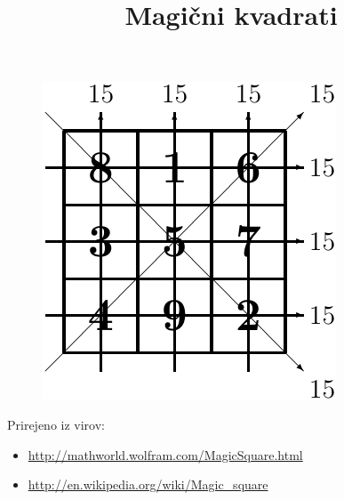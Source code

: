 \documentclass[a4paper,12pt]{article}
\title{Magični kvadrati}
\date{}
\theoremstyle{definition}
\theoremstyle{plain}
\begin{document}
\maketitle

\begin{figure}
   \begin{center}
      \includegraphics{slika.pdf}
   \end{center}
\end{figure}

Prirejeno iz virov:

\begin{itemize}
   \item \url{http://mathworld.wolfram.com/MagicSquare.html}
   \item \url{http://en.wikipedia.org/wiki/Magic_square}
\end{itemize}

\tableofcontents
\end{document}
